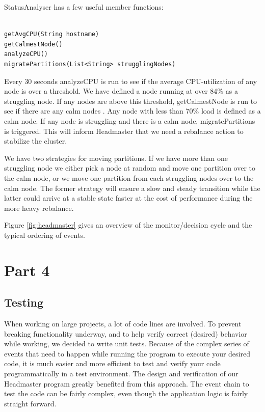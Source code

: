 StatusAnalyser has a few useful member functions:

\begin{lstlisting}[style=customjava,label=lst:test,caption={Helper functions in StatusAnalyzer.}]

getAvgCPU(String hostname)
getCalmestNode()
analyzeCPU()
migratePartitions(List<String> strugglingNodes)

\end{lstlisting}

Every 30 seconds analyzeCPU is run to see if the average CPU-utilization of any node is over a threshold. We have defined a node running at over 84\% as a struggling node. If any nodes are above this threshold, getCalmestNode is run to see if there are any calm nodes . Any node with less than 70\% load is defined as a calm node. If any node is struggling and there is a calm node, migratePartitions is triggered. This will inform Headmaster that we need a rebalance action to stabilize the cluster. 

We have two strategies for moving partitions. If we have more than one struggling node we either pick a node at random and move one partition over to the calm node, or we move one partition from each struggling nodes over to the calm node. The former strategy will ensure a slow and steady transition while the latter could arrive at a stable state faster at the cost of performance during the more heavy rebalance. 

Figure \ref{fig:headmaster} gives an overview of the monitor/decision cycle and the typical ordering of events.

\section{Part 4}
\subsection{Testing}
When working on large projects, a lot of code lines are involved. To prevent breaking functionality underway, and to help verify correct (desired) behavior while working, we decided to write unit tests. 
Because of the complex series of events that need to happen while running the program to execute your desired code, it is much easier and more efficient to test and verify your code programmatically in a test environment. The design and verification of our Headmaster program greatly benefited from this approach. The event chain to test the code can be fairly complex, even though the application logic is fairly straight forward.

